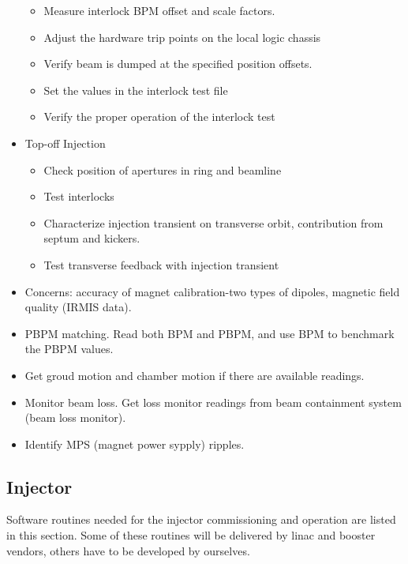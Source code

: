 \documentclass[11pt,oneside,letterpaper,showtrims,article]{memoir}
\begin{document}
\begin{itemize}
\begin{itemize}
  \item Measure interlock BPM offset and scale factors.
  \item Adjust the hardware trip points on the local logic chassis
  \item Verify beam is dumped at the specified position offsets.
  \item Set the values in the interlock test file
  \item Verify the proper operation of the interlock test
  \end{itemize}
\item Top-off Injection
  \begin{itemize}
  \item Check position of apertures in ring and beamline
  \item Test interlocks
  \item Characterize injection transient on transverse orbit, contribution from septum and kickers.
  \item Test transverse feedback with injection transient
  \end{itemize}
\item Concerns: accuracy of magnet calibration-two types of dipoles, magnetic field quality (IRMIS data).
\item PBPM matching. Read both BPM and PBPM, and use BPM to benchmark the
  PBPM values.
\item Get groud motion and chamber motion if there are available readings.
\item Monitor beam loss. Get loss monitor readings from beam containment
  system (beam loss monitor).
\item Identify MPS (magnet power sypply) ripples.
\end{itemize}


\subsection{Injector}

Software routines needed for the injector commissioning and operation are
listed in this section. Some of these routines will be delivered by linac
and booster vendors, others have to be developed by ourselves.
\end{document}

